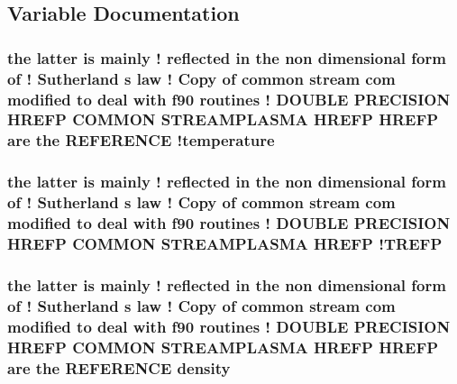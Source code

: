 \subsection{Variable Documentation}
\hypertarget{streamplasma_8com_a7d361ac8a9f115c00cd252dbfbbd14ff}{
\subsubsection[{!temperature}]{\setlength{\rightskip}{0pt plus 5cm}the latter is mainly ! reflected in the non dimensional form of ! Sutherland s law ! Copy of common stream com modified to deal with f90 routines ! D\-O\-U\-B\-L\-E P\-R\-E\-C\-I\-S\-I\-O\-N H\-R\-E\-F\-P C\-O\-M\-M\-O\-N S\-T\-R\-E\-A\-M\-P\-L\-A\-S\-M\-A H\-R\-E\-F\-P H\-R\-E\-F\-P {\bf are} the R\-E\-F\-E\-R\-E\-N\-C\-E !{\bf temperature}}}\label{streamplasma_8com_a7d361ac8a9f115c00cd252dbfbbd14ff}
\hypertarget{streamplasma_8com_a415470db845b59a967ddf481ad4c7efe}{
\subsubsection[{!\-T\-R\-E\-F\-P}]{\setlength{\rightskip}{0pt plus 5cm}the latter is mainly ! reflected in the non dimensional form of ! Sutherland s law ! Copy of common stream com modified to deal with f90 routines ! D\-O\-U\-B\-L\-E P\-R\-E\-C\-I\-S\-I\-O\-N H\-R\-E\-F\-P C\-O\-M\-M\-O\-N S\-T\-R\-E\-A\-M\-P\-L\-A\-S\-M\-A H\-R\-E\-F\-P !{\bf T\-R\-E\-F\-P}}}\label{streamplasma_8com_a415470db845b59a967ddf481ad4c7efe}
\hypertarget{streamplasma_8com_aa525a779932d4a5c5b7500c91aa9703a}{
\subsubsection[{density}]{\setlength{\rightskip}{0pt plus 5cm}the latter is mainly ! reflected in the non dimensional form of ! Sutherland s law ! Copy of common stream com modified to deal with f90 routines ! D\-O\-U\-B\-L\-E P\-R\-E\-C\-I\-S\-I\-O\-N H\-R\-E\-F\-P C\-O\-M\-M\-O\-N S\-T\-R\-E\-A\-M\-P\-L\-A\-S\-M\-A H\-R\-E\-F\-P H\-R\-E\-F\-P {\bf are} the R\-E\-F\-E\-R\-E\-N\-C\-E density}}\label{streamplasma_8com_aa525a779932d4a5c5b7500c91aa9703a}
